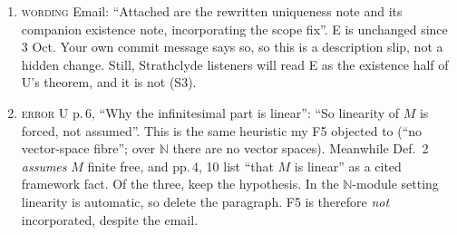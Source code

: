 \documentclass[11pt]{article}
\newcommand{\N}{\mathbb{N}}
\newcommand{\iss}[1]{\textsc{#1}}
\begin{document}
\begin{enumerate}[label=\textbf{S\arabic*.},leftmargin=*]
\item \iss{wording} Email: ``Attached are the rewritten uniqueness note and its companion existence
note, incorporating the scope fix''. E is unchanged since 3 Oct. Your own commit message says so,
so this is a description slip, not a hidden change. Still, Strathclyde listeners will read E as the
existence half of U's theorem, and it is not (S3).
\item \iss{error} U p.\,6, ``Why the infinitesimal part is linear'': ``So linearity of $M$ is
forced, not assumed''. This is the same heuristic my F5 objected to (``no vector-space fibre''; over
$\N$ there are no vector spaces). Meanwhile Def.~2 \emph{assumes} $M$ finite free, and pp.\,4, 10
list ``that $M$ is linear'' as a cited framework fact. Of the three, keep the hypothesis. In the
$\N$-module setting linearity is automatic, so delete the paragraph. F5 is therefore \emph{not}
incorporated, despite the email.
\end{enumerate}
\end{document}
